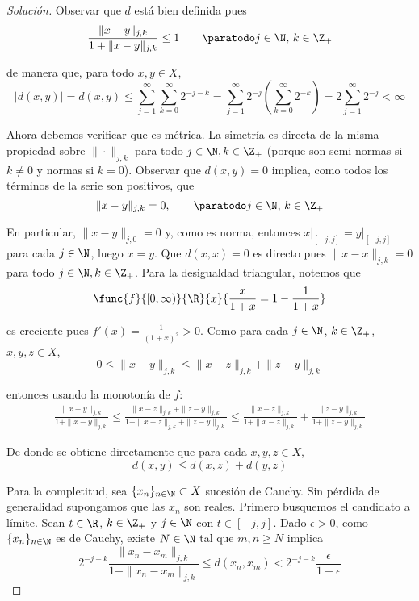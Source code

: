 \documentclass[duedate = 11 de Septiembre, 
			ramo = An\'alisis Funcional, 
			doctype = Tarea 1,
			semester = 2,
			year = 2017]{tarea}
\begin{document}
\begin{proof}[Solución] Observar que $d$ está bien definida pues
	$$\frac{\|x-y\|_{j,k}}{1 + \|x-y\|_{j,k}} \leq 1 \qquad \paratodo j \in \N, \, k \in \Z_{+}$$

de manera que, para todo $x,y \in X$,
	\[
		|d(x,y)|
			=		d(x,y)
			\leq		\sum_{j=1}^{\infty} \sum_{k=0}^{\infty} 2^{-j-k}
			=		\sum_{j=1}^{\infty} 2^{-j} \left(\sum_{k=0}^{\infty} 2^{-k}\right)
			=		2\sum_{j=1}^{\infty} 2^{-j}
			<		\infty
	\tag{1.1}\]

Ahora debemos verificar que es métrica. La simetría es directa de la misma propiedad sobre $\|\cdot\|_{j,k}$ para todo $j \in \N, k \in \Z_{+}$ (porque son semi normas si $k \neq 0$ y normas si $k = 0$). Observar que $d(x,y) = 0$ implica, como todos los términos de la serie son positivos, que
	$$\|x-y\|_{j,k} = 0,	\qquad \paratodo j \in \N, \, k \in \Z_{+}$$

En particular, $\|x-y\|_{j,0} =0 $ y, como es norma, entonces $x\big|_{[-j,j]} = y\big|_{[-j,j]}$ para cada $j \in \N$, luego $x = y$. Que $d(x,x) = 0$ es directo pues $\|x-x\|_{j,k} = 0$ para todo $j \in \N, k \in \Z_{+}$. Para la desigualdad triangular, notemos que
	$$\func{f}{[0,\infty)}{\R}
			{x}{\frac{x}{1+x} = 1 - \frac{1}{1+x}}$$

es creciente pues $f'(x) = \frac{1}{(1+x)^{2}} > 0$. Como para cada $j \in \N$, $k \in \Z_{+}$, $x,y,z \in X$,
	$$0 \leq \|x-y\|_{j,k} \leq \|x-z\|_{j,k} + \|z-y\|_{j,k}$$

entonces usando la monotonía de $f$:
	\begin{align*}
		\frac{\|x-y\|_{j,k}}{1 + \|x-y\|_{j,k}}	
			\leq		\frac{\|x-z\|_{j,k} + \|z-y\|_{j,k}}{1+\|x-z\|_{j,k} + \|z-y\|_{j,k}}
			\leq		\frac{\|x-z\|_{j,k}}{1+\|x-z\|_{j,k}} + \frac{\|z-y\|_{j,k}}{1 + \|z-y\|_{j,k}} 
	\end{align*}

De donde se obtiene directamente que para cada $x,y,z \in X$,
	$$d(x,y) \leq d(x,z) + d(y,z)$$

Para la completitud, sea $\{x_{n}\}_{n \in \N} \subset X$ sucesión de Cauchy. Sin pérdida de generalidad supongamos que las $x_{n}$ son reales. Primero busquemos el candidato a límite. Sean $t \in \R$, $k \in \Z_{+}$ y $j \in \N$ con $t \in [-j,j]$. Dado $\epsilon > 0$, como $\{x_{n}\}_{n \in \N}$ es de Cauchy, existe $N \in \N$ tal que $m,n \geq N$ implica
	$$2^{-j-k} \frac{\|x_{n} - x_{m}\|_{j,k}}{1 + \|x_{n} - x_{m}\|_{j,k}} \leq d(x_{n}, x_{m}) < 2^{-j-k} \frac{\epsilon}{1+\epsilon}$$


\end{proof}
\end{document}
